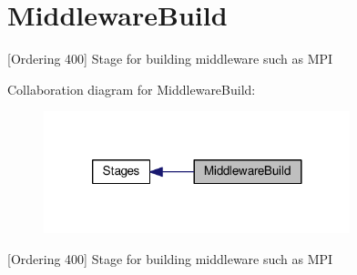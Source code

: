 \hypertarget{group___middleware_build}{\section{Middleware\-Build}
\label{group___middleware_build}
}


\mbox{[}Ordering 400\mbox{]} Stage for building middleware such as M\-P\-I  


Collaboration diagram for Middleware\-Build\-:
\nopagebreak
\begin{figure}[H]
\begin{center}
\leavevmode
\includegraphics[width=252pt]{group___middleware_build}
\end{center}
\end{figure}
\mbox{[}Ordering 400\mbox{]} Stage for building middleware such as M\-P\-I 
